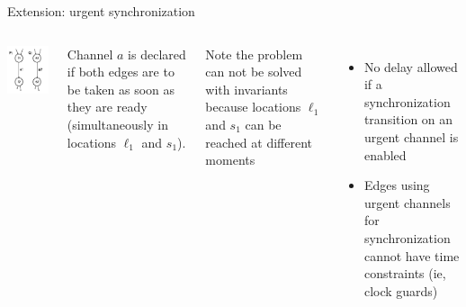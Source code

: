 \documentclass[aspectratio=169]{beamer}
\begin{document}
\begin{slide}{Extension: urgent synchronization}
\small

\begin{columns}
     \includegraphics[width=\textwidth]{./images/urgent.jpg} 

    Channel $a$ is declared  if both edges are to be taken as soon as they are ready 
    (\alert{simultaneously} in locations $\ell_1$ and $s_1$).

    Note the problem can  \alert{not} be solved with \alert{invariants} because locations $\ell_1$ and $s_1$ 
    can be reached at different moments

    \begin{itemize}
    \item No delay allowed if a synchronization transition on an urgent channel is enabled
    \item Edges using urgent channels for synchronization cannot have time constraints (ie, clock guards)
    \end{itemize}
\end{columns}
\end{slide}
\end{document}
